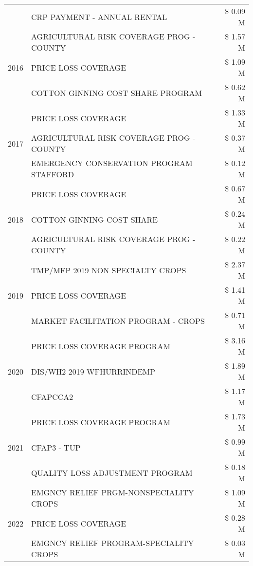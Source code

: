 \begin{tabular}{llr}
 & CRP PAYMENT - ANNUAL RENTAL & \$ 0.09 M \\
\cline{1-3}
\multirow[t]{3}{*}{2016} & AGRICULTURAL RISK COVERAGE PROG - COUNTY & \$ 1.57 M \\
 & PRICE LOSS COVERAGE & \$ 1.09 M \\
 & COTTON GINNING COST SHARE PROGRAM & \$ 0.62 M \\
\cline{1-3}
\multirow[t]{3}{*}{2017} & PRICE LOSS COVERAGE & \$ 1.33 M \\
 & AGRICULTURAL RISK COVERAGE PROG - COUNTY & \$ 0.37 M \\
 & EMERGENCY CONSERVATION PROGRAM STAFFORD & \$ 0.12 M \\
\cline{1-3}
\multirow[t]{3}{*}{2018} & PRICE LOSS COVERAGE & \$ 0.67 M \\
 & COTTON GINNING COST SHARE & \$ 0.24 M \\
 & AGRICULTURAL RISK COVERAGE PROG - COUNTY & \$ 0.22 M \\
\cline{1-3}
\multirow[t]{3}{*}{2019} & TMP/MFP 2019 NON SPECIALTY CROPS & \$ 2.37 M \\
 & PRICE LOSS COVERAGE & \$ 1.41 M \\
 & MARKET FACILITATION PROGRAM - CROPS & \$ 0.71 M \\
\cline{1-3}
\multirow[t]{3}{*}{2020} & PRICE LOSS COVERAGE PROGRAM & \$ 3.16 M \\
 & DIS/WH2 2019 WFHURRINDEMP & \$ 1.89 M \\
 & CFAPCCA2 & \$ 1.17 M \\
\cline{1-3}
\multirow[t]{3}{*}{2021} & PRICE LOSS COVERAGE PROGRAM & \$ 1.73 M \\
 & CFAP3 - TUP & \$ 0.99 M \\
 & QUALITY LOSS ADJUSTMENT PROGRAM & \$ 0.18 M \\
\cline{1-3}
\multirow[t]{3}{*}{2022} & EMGNCY RELIEF PRGM-NONSPECIALITY CROPS & \$ 1.09 M \\
 & PRICE LOSS COVERAGE & \$ 0.28 M \\
 & EMGNCY RELIEF PROGRAM-SPECIALITY CROPS & \$ 0.03 M \\
\cline{1-3}
\bottomrule
\end{tabular}
